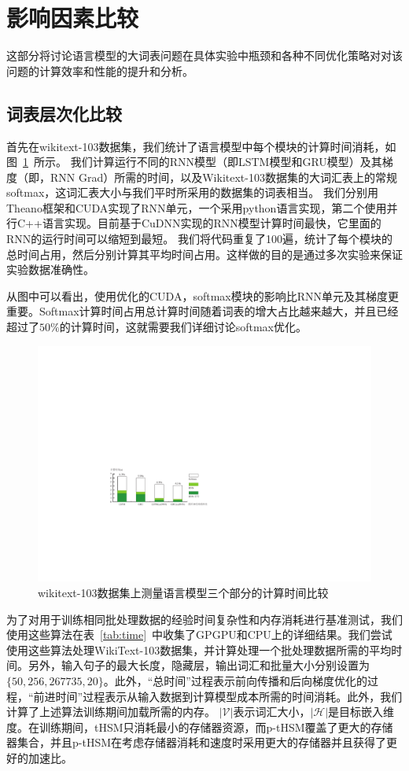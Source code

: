 \section{影响因素比较}
这部分将讨论语言模型的大词表问题在具体实验中瓶颈和各种不同优化策略对对该问题的计算效率和性能的提升和分析。
\subsection{词表层次化比较}
首先在wikitext-103数据集，我们统计了语言模型中每个模块的计算时间消耗，如图~\ref{fig:rnn_timing}~所示。 我们计算运行不同的RNN模型（即LSTM模型和GRU模型）及其梯度（即，RNN Grad）所需的时间，以及Wikitext-103数据集的大词汇表上的常规softmax，这词汇表大小与我们平时所采用的数据集的词表相当。 我们分别用Theano框架和CUDA实现了RNN单元，一个采用python语言实现，第二个使用并行C++语言实现。目前基于CuDNN实现的RNN模型计算时间最快，它里面的RNN的运行时间可以缩短到最短。 我们将代码重复了100遍，统计了每个模块的总时间占用，然后分别计算其平均时间占用。这样做的目的是通过多次实验来保证实验数据准确性。

从图中可以看出，使用优化的CUDA，softmax模块的影响比RNN单元及其梯度更重要。Softmax计算时间占用总计算时间随着词表的增大占比越来越大，并且已经超过了$50\%$的计算时间，这就需要我们详细讨论softmax优化。


\begin{figure}[!ht]
  \centering
  \includegraphics[width=.9\columnwidth]{./figures/rnn_timing.pdf}
  \caption{wikitext-103数据集上测量语言模型三个部分的计算时间比较}\label{fig:rnn_timing}
\end{figure}


为了对用于训练相同批处理数据的经验时间复杂性和内存消耗进行基准测试，我们使用这些算法在表~\ref{tab:time}~中收集了GPGPU和CPU上的详细结果。我们尝试使用这些算法处理WikiText-103数据集，并计算处理一个批处理数据所需的平均时间。另外，输入句子的最大长度，隐藏层，输出词汇和批量大小分别设置为$\{50, 256, 267735, 20\}$。此外，“总时间”过程表示前向传播和后向梯度优化的过程，“前进时间”过程表示从输入数据到计算模型成本所需的时间消耗。此外，我们计算了上述算法训练期间加载所需的内存。 $ \mathcal{| V |} $表示词汇大小，$ \mathcal{| H |} $是目标嵌入维度。在训练期间，tHSM只消耗最小的存储器资源，而p-tHSM覆盖了更大的存储器集合，并且p-tHSM在考虑存储器消耗和速度时采用更大的存储器并且获得了更好的加速比。

